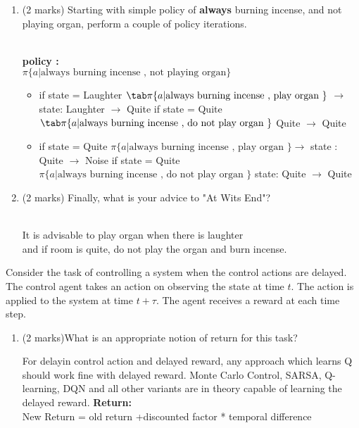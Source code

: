 \documentclass[addpoints,12pt,solution]{exam}
\begin{document}
\begin{questions}
\begin{enumerate}[label=(\alph*)]
    \item (2 marks) Starting with simple policy of \textbf{always} burning incense, and not playing organ, perform a couple of policy iterations.
\begin{solution}
\\
\textbf{policy : }\\
$\pi\{a|\text{always burning incense , not playing organ\}} $ \\
\begin{itemize}
	\item if state = Laughter 
	\subitem	$\tab\pi\{a|\text{always burning incense , play organ \}} $ $\rightarrow$ state: Laughter $\rightarrow $ Quite 
	\subitem if state = Quite
	\subitem $\tab\pi\{a|\text{always burning incense , do not play organ \}}$ Quite  $\rightarrow$ Quite 
	
	
	\item if state = Quite 
	\subitem $\pi\{a|\text{always burning incense , play organ \}} \rightarrow $ state : Quite $\rightarrow$ Noise
	 \subitem if state = Quite 
	\subitem $\pi\{a|\text{always burning incense , do not play organ \}} $ state: Quite $\rightarrow$ Quite\\	
	
	
\end{itemize}

	

\end{solution}
    
    \item (2 marks) Finally, what is your advice to "At Wits End"?
\begin{solution}
\\
It is advisable to play organ when there is laughter \\
and if room is quite, do not play the organ and burn incense. 
\end{solution}
    
    
\end{enumerate}

\question[4] Consider the task of controlling a system when the control actions are delayed. The control agent takes an action on observing the state at time $t$. The action is applied to the system at time $t + \tau$. The agent
receives a reward at each time step.
\begin{enumerate}[label=(\alph*)]
\item (2 marks)What is an appropriate notion of return for this task?
\begin{solution}
For delayin control action and delayed reward, any approach which learns Q should work fine with delayed reward.  Monte Carlo Control, SARSA, Q-learning, DQN and all other variants are in theory capable of learning the delayed reward.\cite{ans}
\textbf{Return:} \\
New Return  = old return +discounted factor *  temporal difference 


\end{solution}
\end{enumerate}
\end{questions}
\end{document}
